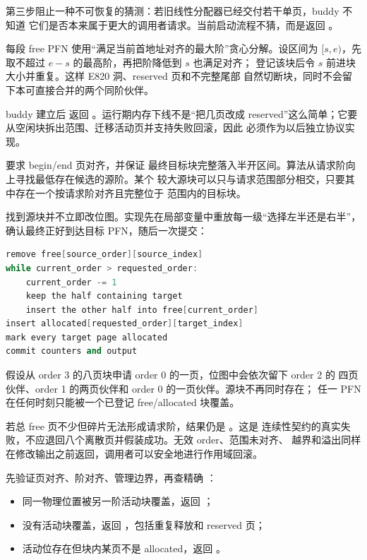 第三步阻止一种不可恢复的猜测：若旧线性分配器已经交付若干单页，buddy 不知道
它们是否本来属于更大的调用者请求。当前启动流程不猜，而是返回
。

每段 free PFN 使用“满足当前首地址对齐的最大阶”贪心分解。设区间为
\([s,e)\)，先取不超过 \(e-s\) 的最高阶，再把阶降低到 \(s\) 也满足对齐；
登记该块后令 \(s\) 前进块大小并重复。这样 E820 洞、reserved 页和不完整尾部
自然切断块，同时不会留下本可直接合并的两个同阶伙伴。

buddy 建立后  返回
。运行期内存下线不是“把几页改成
reserved”这么简单；它要从空闲块拆出范围、迁移活动页并支持失败回滚，因此
必须作为以后独立协议实现。

 要求 begin/end 页对齐，并保证
最终目标块完整落入半开区间。算法从请求阶向上寻找最低存在候选的源阶。某个
较大源块可以只与请求范围部分相交，只要其中存在一个按请求阶对齐且完整位于
范围内的目标块。

找到源块并不立即改位图。实现先在局部变量中重放每一级“选择左半还是右半”，
确认最终正好到达目标 PFN，随后一次提交：

\begin{lstlisting}[language=C++]
remove free[source_order][source_index]
while current_order > requested_order:
    current_order -= 1
    keep the half containing target
    insert the other half into free[current_order]
insert allocated[requested_order][target_index]
mark every target page allocated
commit counters and output
\end{lstlisting}

假设从 order 3 的八页块申请 order 0 的一页，位图中会依次留下 order 2 的
四页伙伴、order 1 的两页伙伴和 order 0 的一页伙伴。源块不再同时存在；
任一 PFN 在任何时刻只能被一个已登记 free/allocated 块覆盖。

若总 free 页不少但碎片无法形成请求阶，结果仍是 。这是
连续性契约的真实失败，不应退回八个离散页并假装成功。无效 order、范围未对齐、
越界和溢出同样在修改输出之前返回，调用者可以安全地进行作用域回滚。

 先验证页对齐、阶对齐、管理边界，再查精确
：

\begin{itemize}
  \item 同一物理位置被另一阶活动块覆盖，返回
        ；
  \item 没有活动块覆盖，返回 ，包括重复释放和
        reserved 页；
  \item 活动位存在但块内某页不是 allocated，返回 。
\end{itemize}

